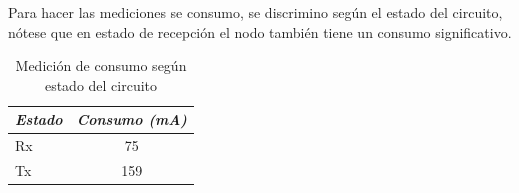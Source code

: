 Para hacer las mediciones se consumo, se discrimino según el estado del circuito, nótese que en estado de recepción el nodo también tiene un consumo significativo.

\begin{table}[ht]
	\centering
	\caption{Medición de consumo según estado del circuito}
	\begin{tabular}{@{} l *1c @{}}    \toprule
		\emph{\textbf{Estado}} & \emph{\textbf{Consumo (mA)}}\\
		\midrule
		Rx &  75\\	
		Tx	&  159\\
		\bottomrule
		\hline
	\end{tabular}
	\label{tab:bq}
\end{table}



